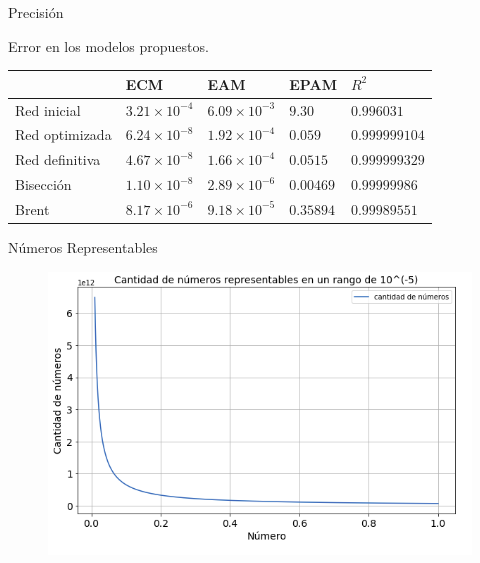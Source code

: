 \documentclass{beamer}
\begin{document}
\begin{frame}{Precisi\'on}

    Error en los modelos propuestos.
    \begin{table}[!htbp]
      \begin{center}
        \begin{tabular}{|l|l|l|l|l|}
          \hline
           & ECM & EAM  &  EPAM & $R^2$ \\ \hline
          Red inicial  & $3.21 \times 10^{-4}$ & $6.09 \times 10^{-3}$ & $9.30$ & $0.996031$ \\ \hline
          Red optimizada & $6.24\times10^{-8}$ & $1.92\times10^{-4}$ & $0.059$ & $0.999999104$ \\ \hline
          Red definitiva & $4.67\times10^{-8}$ & $1.66\times10^{-4}$ & $0.0515$ & $0.999999329$\\ \hline
          Bisecci\'on  & $1.10\times10^{-8}$ & $2.89\times10^{-6}$ & $0.00469$ & $0.99999986$  \\ \hline
          Brent & $8.17\times10^{-6}$ &  $ 9.18\times10^{-5}$ & $0.35894$ & $0.99989551$  \\ \hline
        \end{tabular}
      \end{center}
    \end{table}


\end{frame}

\begin{frame}{N\'umeros Representables}

    \begin{figure}[!tbp]
        \includegraphics[scale=0.5]{precision_g}
    \end{figure}

\end{frame}
\end{document}

